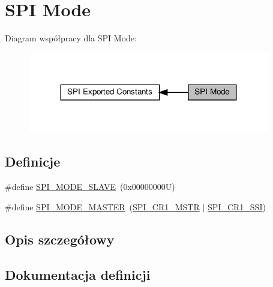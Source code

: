 \hypertarget{group___s_p_i___mode}{}\section{S\+PI Mode}
\label{group___s_p_i___mode}
Diagram współpracy dla S\+PI Mode\+:\nopagebreak
\begin{figure}[H]
\begin{center}
\leavevmode
\includegraphics[width=299pt]{group___s_p_i___mode}
\end{center}
\end{figure}
\subsection*{Definicje}
\begin{DoxyCompactItemize}
\item 
\#define \hyperlink{group___s_p_i___mode_ga75f094fee5a9dc10b88401ccd17925d3}{S\+P\+I\+\_\+\+M\+O\+D\+E\+\_\+\+S\+L\+A\+VE}~(0x00000000\+U)
\item 
\#define \hyperlink{group___s_p_i___mode_gaa335c2abdfad9e6f6c2677719d93b64e}{S\+P\+I\+\_\+\+M\+O\+D\+E\+\_\+\+M\+A\+S\+T\+ER}~(\hyperlink{group___peripheral___registers___bits___definition_ga5b3b6ae107fc37bf18e14506298d7a55}{S\+P\+I\+\_\+\+C\+R1\+\_\+\+M\+S\+TR} $\vert$ \hyperlink{group___peripheral___registers___bits___definition_ga5f154374b58c0234f82ea326cb303a1e}{S\+P\+I\+\_\+\+C\+R1\+\_\+\+S\+SI})
\end{DoxyCompactItemize}


\subsection{Opis szczegółowy}


\subsection{Dokumentacja definicji}
\mbox{\label{group___s_p_i___mode_gaa335c2abdfad9e6f6c2677719d93b64e}} 
